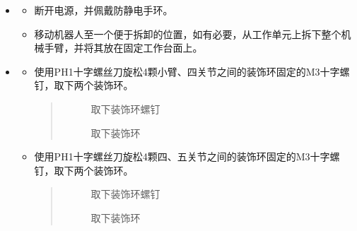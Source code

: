 \documentclass[a4paper,11pt,english,openany,oneside]{sphinxmanual}
\begin{document}
\sphinxAtStartPar
{}
\begin{itemize}
\item {} 
\sphinxAtStartPar
{}
\begin{itemize}
\item {} 
\sphinxAtStartPar
断开电源，并佩戴防静电手环。

\item {} 
\sphinxAtStartPar
移动机器人至一个便于拆卸的位置，如有必要，从工作单元上拆下整个机械手臂，并将其放在固定工作台面上。

\end{itemize}

\item {} 
\sphinxAtStartPar
{}
\begin{itemize}
\item {} 
\sphinxAtStartPar
使用PH1十字螺丝刀旋松4颗小臂、四关节之间的装饰环固定的M3十字螺钉，取下两个装饰环。
\begin{quote}

\begin{figure}[H]
\centering
\capstart

\noindent{}
\caption{取下装饰环螺钉}\label{\detokenize{_u66f4_u6362_u5173_u8282:id71}}\end{figure}

\begin{figure}[H]
\centering
\capstart

\noindent{}
\caption{取下装饰环}\label{\detokenize{_u66f4_u6362_u5173_u8282:id72}}\end{figure}
\end{quote}

\item {} 
\sphinxAtStartPar
使用PH1十字螺丝刀旋松4颗四、五关节之间的装饰环固定的M3十字螺钉，取下两个装饰环。
\begin{quote}

\begin{figure}[H]
\centering
\capstart

\noindent{}
\caption{取下装饰环螺钉}\label{\detokenize{_u66f4_u6362_u5173_u8282:id73}}\end{figure}

\begin{figure}[H]
\centering
\capstart

\noindent{}
\caption{取下装饰环}\label{\detokenize{_u66f4_u6362_u5173_u8282:id74}}\end{figure}
\end{quote}


\end{itemize}
\end{itemize}
\end{document}

